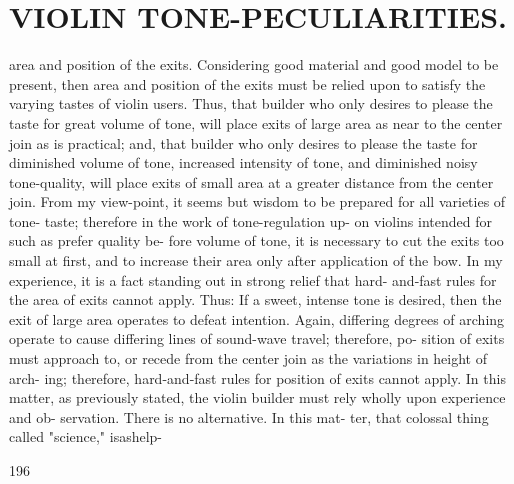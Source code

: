 \documentclass{article}
\begin{document}
\section*{VIOLIN TONE-PECULIARITIES.}
area and position of the exits. Considering good material and good model to be present, then area and position of the exits must be relied upon to satisfy the varying tastes of violin users. Thus, that builder who only desires to please the taste for great volume of tone, will place exits of large area as near to the center join as is practical; and, that builder who only desires to please the taste for diminished volume of tone, increased intensity of tone, and diminished noisy tone-quality, will place exits of small area at a greater distance from the center join. From my view-point, it seems but wisdom to be prepared for all varieties of tone- taste; therefore in the work of tone-regulation up- on violins intended for such as prefer quality be- fore volume of tone, it is necessary to cut the exits too small at first, and to increase their area only after application of the bow. In my experience, it is a fact standing out in strong relief that hard- and-fast rules for the area of exits cannot apply. Thus: If a sweet, intense tone is desired, then the exit of large area operates to defeat intention. Again, differing degrees of arching operate to cause differing lines of sound-wave travel; therefore, po- sition of exits must approach to, or recede from the center join as the variations in height of arch- ing; therefore, hard-and-fast rules for position of exits cannot apply. In this matter, as previously stated, the violin builder must rely wholly upon experience and ob- servation. There is no alternative. In this mat- ter, that colossal thing called "science," isashelp-

196
\end{document}
